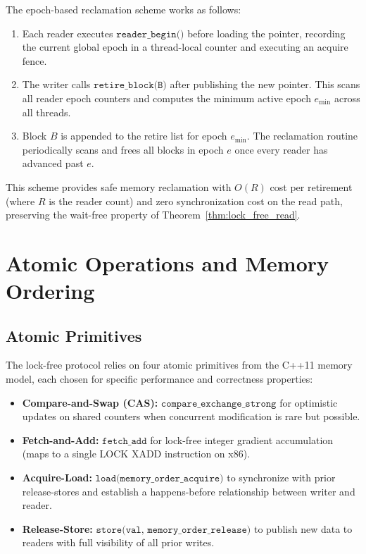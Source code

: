 The epoch-based reclamation scheme works as follows:

\begin{enumerate}
    \item Each reader executes $\texttt{reader\_begin()}$ before loading the pointer, recording the current global epoch in a thread-local counter and executing an acquire fence.
    \item The writer calls $\texttt{retire\_block(B)}$ after publishing the new pointer. This scans all reader epoch counters and computes the minimum active epoch $e_{\min}$ across all threads.
    \item Block $B$ is appended to the retire list for epoch $e_{\min}$. The reclamation routine periodically scans and frees all blocks in epoch $e$ once every reader has advanced past $e$.
\end{enumerate}

This scheme provides safe memory reclamation with $O(R)$ cost per retirement (where $R$ is the reader count) and zero synchronization cost on the read path, preserving the wait-free property of Theorem~\ref{thm:lock_free_read}.

\section{Atomic Operations and Memory Ordering}
\label{sec:atomic_operations}

\subsection{Atomic Primitives}

The lock-free protocol relies on four atomic primitives from the C++11 memory model, each chosen for specific performance and correctness properties:

\begin{itemize}
    \item \textbf{Compare-and-Swap (CAS):} $\texttt{compare\_exchange\_strong}$ for optimistic updates on shared counters when concurrent modification is rare but possible.
    \item \textbf{Fetch-and-Add:} $\texttt{fetch\_add}$ for lock-free integer gradient accumulation (maps to a single LOCK XADD instruction on x86).
    \item \textbf{Acquire-Load:} $\texttt{load(memory\_order\_acquire)}$ to synchronize with prior release-stores and establish a happens-before relationship between writer and reader.
    \item \textbf{Release-Store:} $\texttt{store(val, memory\_order\_release)}$ to publish new data to readers with full visibility of all prior writes.
\end{itemize}

